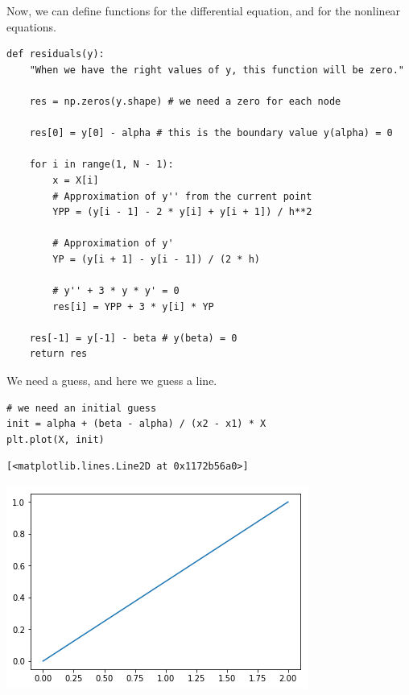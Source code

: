 \documentclass[11pt]{article}
\begin{document}
Now, we can define functions for the differential equation, and for the nonlinear equations.

\begin{verbatim}
def residuals(y):
    "When we have the right values of y, this function will be zero."

    res = np.zeros(y.shape) # we need a zero for each node

    res[0] = y[0] - alpha # this is the boundary value y(alpha) = 0

    for i in range(1, N - 1):
        x = X[i]
        # Approximation of y'' from the current point
        YPP = (y[i - 1] - 2 * y[i] + y[i + 1]) / h**2

        # Approximation of y'
        YP = (y[i + 1] - y[i - 1]) / (2 * h)

        # y'' + 3 * y * y' = 0
        res[i] = YPP + 3 * y[i] * YP

    res[-1] = y[-1] - beta # y(beta) = 0
    return res
\end{verbatim}

We need a guess, and here we guess a line.

\begin{verbatim}
# we need an initial guess
init = alpha + (beta - alpha) / (x2 - x1) * X
plt.plot(X, init)
\end{verbatim}

\begin{verbatim}
[<matplotlib.lines.Line2D at 0x1172b56a0>]
\end{verbatim}



\begin{center}
\includegraphics[width=.9\linewidth]{obipy-resources/9f7f3151fe203e2a10edce4b06f0b33f-90490Pwa.png}
\end{center}
\end{document}
